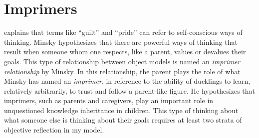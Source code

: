 \section{Imprimers}

\cite{minsky:2006} explains that terms like ``guilt'' and ``pride''
can refer to self-conscious ways of thinking.  Minsky hypothesizes
that there are powerful ways of thinking that result when someone whom
one respects, like a parent, values or devalues their goals.  This
type of relationship between object models is named an \emph{imprimer
  relationship} by Minsky.  In this relationship, the parent plays the
role of what Minsky has named an \emph{imprimer}, in reference to the
ability of ducklings to learn, relatively arbitrarily, to trust and
follow a parent-like figure.  He hypothesizes that imprimers, such as
parents and caregivers, play an important role in unquestioned
knowledge inheritance in children.  This type of thinking about what
someone else is thinking about their goals requires at least two
strata of objective reflection in my model.

